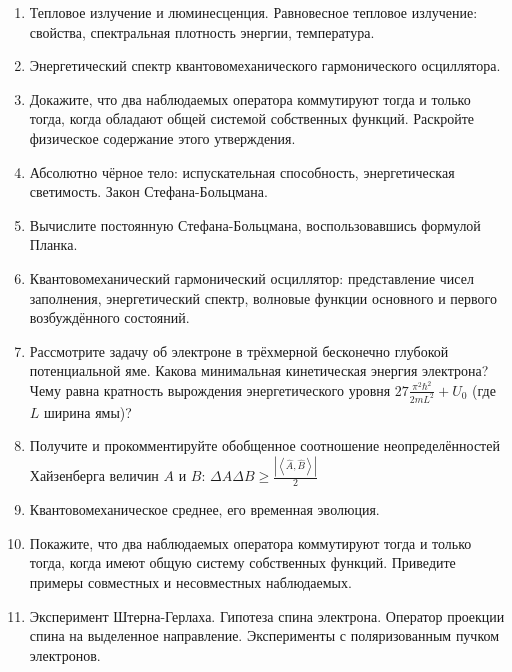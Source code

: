 \documentclass[12pt]{article}
\newcommand{\kL}[1]{\label{К-#1}}
\def\twodigits#1{%
\ifnum#1<10 0\fi 
\number#1}
\begin{document}
\begin{enumerate}[label={\textbf{К-\protect\twodigits{\theenumi}}}]

\item\kL{1} 
Тепловое излучение и люминесценция. Равновесное тепловое излучение: свойства, спектральная плотность энергии, температура.

\item\kL{2}
Энергетический спектр квантовомеханического гармонического осциллятора.

\item\kL{3}
Докажите, что два наблюдаемых оператора коммутируют тогда и только тогда, когда обладают общей системой собственных функций. Раскройте физическое содержание этого утверждения.

\item\kL{4}
Абсолютно чёрное тело: испускательная способность, энергетическая светимость. Закон Стефана-Больцмана.

\item\kL{5}
Вычислите постоянную Стефана-Больцмана, воспользовавшись формулой Планка.

\item\kL{6}
Квантовомеханический гармонический осциллятор: представление чисел заполнения, энергетический спектр, волновые функции основного и первого возбуждённого состояний.

\item\kL{7}
Рассмотрите задачу об электроне в трёхмерной бесконечно глубокой потенциальной яме. Какова минимальная кинетическая энергия электрона? Чему равна кратность вырождения энергетического уровня $27\frac{\pi^2\hbar^2}{2mL^2}+U_0$ (где $L$ ширина ямы)?

\item\kL{8}
Получите и прокомментируйте обобщенное соотношение неопределённостей Хайзенберга величин $A$ и $B$: $\Delta A\Delta B \ge \frac{\left|\left<\hat{A},\hat{B}\right>\right|}{2}$

\item\kL{9}
Квантовомеханическое среднее, его временная эволюция.

\item\kL{10}
Покажите, что два наблюдаемых оператора коммутируют тогда и только тогда, когда имеют общую систему собственных функций. Приведите примеры совместных и несовместных наблюдаемых.

\item\kL{11}
Эксперимент Штерна-Герлаха. Гипотеза спина электрона. Оператор проекции спина на выделенное направление. Эксперименты с поляризованным пучком электронов.


\end{enumerate}
\end{document}
